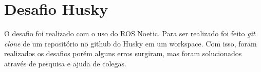 \section{Desafio Husky}

O desafio foi realizado com o uso do ROS Noetic. Para ser realizado foi feito \textit{git clone} de um repositório no github do Husky em um workspace. Com isso, foram realizados os desafios porém alguns erros surgiram, mas foram solucionados através de pesquisa e ajuda de colegas.




